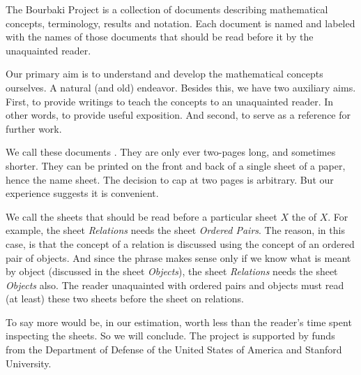 
The Bourbaki Project is a collection
of documents describing mathematical
concepts, terminology, results and
notation. Each document is named and
labeled with the names of those documents
that should be read before it by the
unaquainted reader.

Our primary aim is to understand and
develop the mathematical concepts ourselves.
A natural (and old) endeavor.
Besides this, we have two auxiliary aims.
First, to provide writings to teach
the concepts to an unaquainted reader. In other
words, to provide useful exposition.
And second, to serve as a reference for
further work.

We call these documents .
They are only ever two-pages long, and
sometimes shorter.
They can be printed on the front
and back of a single
sheet of a paper, hence the name sheet.
The decision to cap at two pages is
arbitrary.
But our
experience suggests it is convenient.

We call the sheets that should
be read before a particular sheet
$X$ the  of $X$.
For example, the sheet \textit{Relations}
needs the sheet \textit{Ordered Pairs}.
The reason, in this case, is that the
concept of a relation is discussed using
the concept of an ordered pair of objects.
And since the phrase
 makes sense
only if we know what is meant by object
(discussed in the sheet \textit{Objects}),
the sheet \textit{Relations} needs the sheet
\textit{Objects} also.
The reader unaquainted with
ordered pairs and
objects must read (at least) these two
sheets before the sheet on relations.



%
%


To say more would be, in our
estimation,
worth less than the reader's
time spent inspecting the sheets.
So we will conclude.
The project is supported by
funds from the Department of
Defense of the United States of America
and Stanford University.
